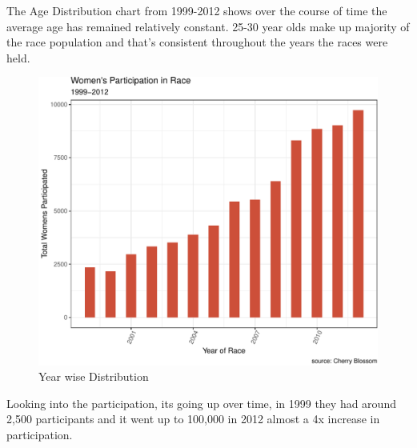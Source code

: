\documentclass[
]{article}
\begin{document}
The Age Distribution chart from 1999-2012 shows over the course of time
the average age has remained relatively constant. 25-30 year olds make
up majority of the race population and that's consistent throughout the
years the races were held.

\begin{figure}[H]

\includegraphics[width=.49\linewidth,]{case_study02_SO02_files/figure-latex/unnamed-chunk-13-1} \hfill{}

\caption{Year wise Distribution}\label{fig:unnamed-chunk-13}
\end{figure}

Looking into the participation, its going up over time, in 1999 they had
around 2,500 participants and it went up to 100,000 in 2012 almost a 4x
increase in participation.
\end{document}
